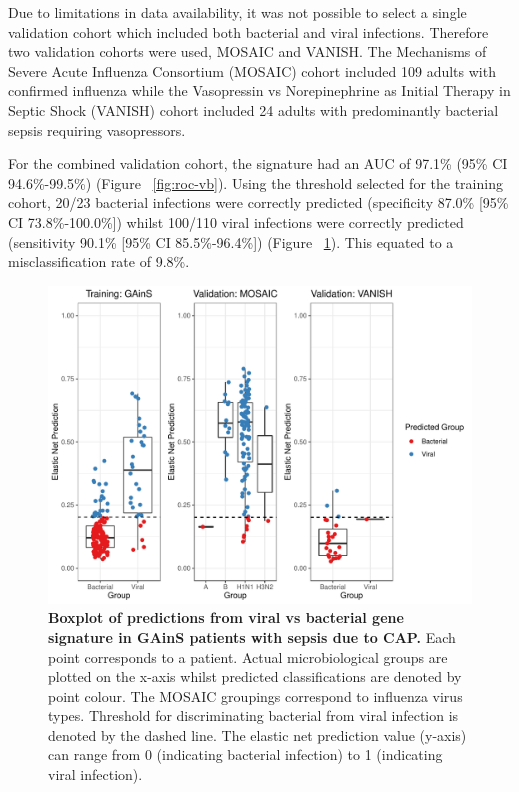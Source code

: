 Due to limitations in data availability, it was not possible to select a single validation cohort which included both bacterial and viral infections. Therefore two validation cohorts were used, MOSAIC and VANISH. The Mechanisms of Severe Acute Influenza Consortium (MOSAIC) cohort included 109 adults with confirmed influenza while the Vasopressin vs Norepinephrine as Initial Therapy in Septic Shock (VANISH) cohort included 24 adults with predominantly bacterial sepsis requiring vasopressors. 

For the combined validation cohort, the signature had an AUC of 97.1\% (95\% CI 94.6\%-99.5\%) (Figure ~\ref{fig:roc-vb}). Using the threshold selected for the training cohort, 20/23 bacterial infections were correctly predicted (specificity 87.0\% [95\% CI 73.8\%-100.0\%]) whilst 100/110 viral infections were correctly predicted (sensitivity 90.1\% [95\% CI 85.5\%-96.4\%]) (Figure ~\ref{fig:boxplot-vb}). This equated to a misclassification rate of 9.8\%. 

\FloatBarrier
\begin{figure}[htbp]
\centering
\includegraphics[width=\textwidth]{./Results3/Images/boxplot-viral-signature.pdf}
\caption[Boxplot of viral vs bacterial signature]{\textbf{Boxplot of predictions from viral vs bacterial gene signature in GAinS patients with sepsis due to CAP.} Each point corresponds to a patient. Actual microbiological groups are plotted on the x-axis whilst predicted classifications are denoted by point colour. The MOSAIC groupings correspond to influenza virus types. Threshold for discriminating bacterial from viral infection is denoted by the dashed line. The elastic net prediction value (y-axis) can range from 0 (indicating bacterial infection) to 1 (indicating viral infection).}
\label{fig:boxplot-vb}
\end{figure}
\FloatBarrier


